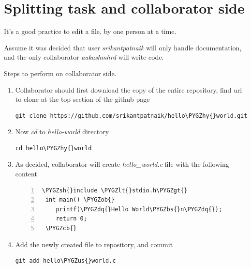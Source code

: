 \documentclass[letterpaper,10pt,english]{sphinxmanual}
\def\PYGZbs{\char`\\}
\def\PYGZus{\char`\_}
\def\PYGZob{\char`\{}
\def\PYGZcb{\char`\}}
\def\PYGZlt{\char`\<}
\def\PYGZgt{\char`\>}
\def\PYGZsh{\char`\#}
\def\PYGZhy{\char`\-}
\def\PYGZdq{\char`\"}
\begin{document}
\begin{DUlineblock}{0em}
\item[] 
\item[] 
\end{DUlineblock}


\section{Splitting task and collaborator side}
\label{version-control:splitting-task-and-collaborator-side}
It's a good practice to edit a file, by one person at a time.

Assume it was decided that user \emph{srikantpatnaik} will only handle
documentation, and the only collaborator \emph{aakashmhrd} will write code.

Steps to perform on collaborator side.
\begin{enumerate}
\item {} 
Collaborator should first download the copy of the entire repository,
find url to clone at the top section of the github page

\begin{Verbatim}[commandchars=\\\{\}]
git clone https://github.com/srikantpatnaik/hello\PYGZhy{}world.git
\end{Verbatim}

\item {} 
Now \emph{cd} to \emph{hello-world} directory

\begin{Verbatim}[commandchars=\\\{\}]
cd hello\PYGZhy{}world
\end{Verbatim}

\item {} 
As decided, collaborator will create \emph{hello\_world.c} file with the following
content

\begin{Verbatim}[commandchars=\\\{\},numbers=left,firstnumber=1,stepnumber=1]
 \PYGZsh{}include \PYGZlt{}stdio.h\PYGZgt{}
 int main() \PYGZob{}
    printf(\PYGZdq{}Hello World\PYGZbs{}n\PYGZdq{});
    return 0;
 \PYGZcb{}
\end{Verbatim}

\item {} 
Add the newly created file to repository, and commit

\begin{Verbatim}[commandchars=\\\{\}]
git add hello\PYGZus{}world.c
\end{Verbatim}


\end{enumerate}
\end{document}
